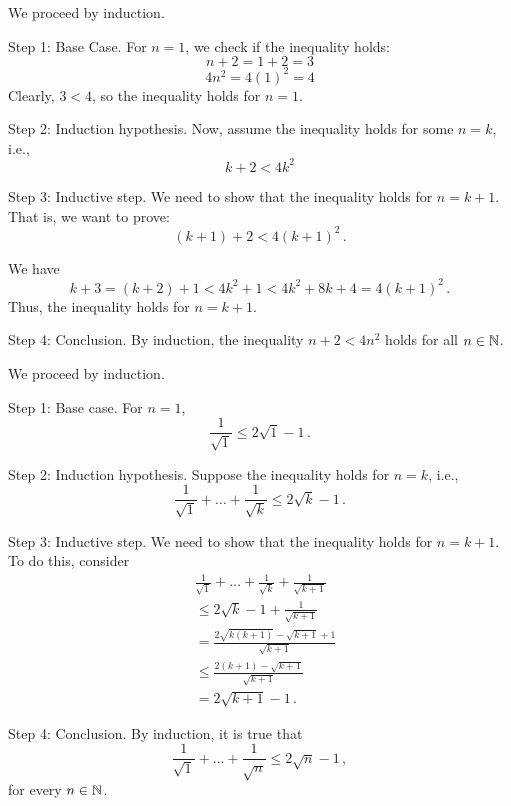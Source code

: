 \documentclass[12pt]{amsart}
\begin{document}
\begin{problem}[4.5.a]
We proceed by induction.

Step 1: Base Case.
For $n = 1$, we check if the inequality holds:
\[
	n + 2 = 1 + 2 = 3
\]
\[
	4n^2 = 4(1)^2 = 4
\]
Clearly, $3 < 4$, so the inequality holds for $n = 1$.

Step 2: Induction hypothesis.
Now, assume the inequality holds for some $n = k$, i.e.,
\[
	k + 2 < 4k^2
\]


Step 3: Inductive step.
We need to show that the inequality holds for $n = k + 1$. That is, we want to prove:
\[
	(k + 1) + 2 < 4(k + 1)^2 \,.
\]

We have
\begin{equation*}
	k + 3  = (k+2) +1 < 4k^2 + 1 < 4k^2 + 8k + 4 = 4(k+1)^2 \,.
\end{equation*}
Thus, the inequality holds for $n=k+1$.

Step 4: Conclusion.
By induction, the inequality $n + 2 < 4n^2$ holds for all $n \in \mathbb{N}$.

\end{problem}

\begin{problem}[4.5.b]
We proceed by induction.

Step 1: Base case.
For $n = 1$,
$$ \frac{1}{\sqrt 1} \leq 2 \sqrt 1 - 1 \,.$$

Step 2: Induction hypothesis.
Suppose the inequality holds for $n = k$, i.e.,
$$ \frac{1}{\sqrt{1}} + \dots + \frac{1}{\sqrt k} \leq 2 \sqrt k - 1 \,. $$


Step 3: Inductive step.
We need to show that the inequality holds for $n = k+1$.
To do this, consider
\begin{align*}
	 & \frac{1}{\sqrt{1}} + \dots + \frac{1}{\sqrt k} + \frac{1}{\sqrt{k+1}} \\
	 & \leq 2 \sqrt{k} - 1 + \frac{1}{\sqrt{k+1}}                            \\
	 & = \frac{ 2 \sqrt{k(k+1)} - \sqrt{k+1} +1}{\sqrt{k+1}}                 \\
	 & \leq \frac{ 2 (k+1) - \sqrt{k+1}}{\sqrt{k+1}}                         \\
	 & = 2 \sqrt{k+1} -1 \,.
\end{align*}

Step 4: Conclusion.
By induction,
it is true that
$$ \frac{1}{\sqrt{1}} + \dots + \frac{1}{\sqrt n} \leq 2 \sqrt n - 1 \,,$$
for every $n\in \mathbb{N}$.



\end{problem}


%
%
\end{document}
